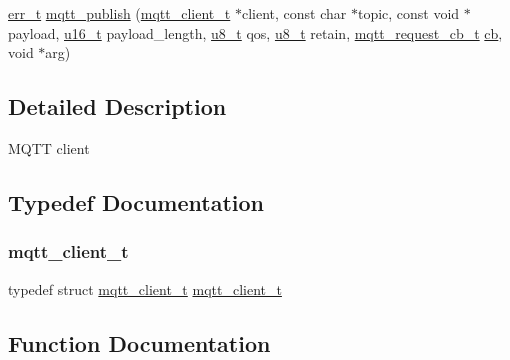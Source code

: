 \begin{DoxyCompactItemize}
\item 
\hyperlink{group__infrastructure__errors_gaf02d9da80fd66b4f986d2c53d7231ddb}{err\+\_\+t} \hyperlink{openmote-cc2538_2lwip_2src_2include_2lwip_2apps_2mqtt_8h_ade9850d716e81fde572cb012be795d2f}{mqtt\+\_\+publish} (\hyperlink{structmqtt__client__t}{mqtt\+\_\+client\+\_\+t} $\ast$client, const char $\ast$topic, const void $\ast$payload, \hyperlink{group__compiler__abstraction_ga77570ac4fcab86864fa1916e55676da2}{u16\+\_\+t} payload\+\_\+length, \hyperlink{group__compiler__abstraction_ga4caecabca98b43919dd11be1c0d4cd8e}{u8\+\_\+t} qos, \hyperlink{group__compiler__abstraction_ga4caecabca98b43919dd11be1c0d4cd8e}{u8\+\_\+t} retain, \hyperlink{group__mqtt_gacad2bbe2cee76eaa120cc63e2f6094fd}{mqtt\+\_\+request\+\_\+cb\+\_\+t} \hyperlink{periph__rtt_2main_8c_afd4145001d494db2ea612e1239724148}{cb}, void $\ast$arg)
\end{DoxyCompactItemize}


\subsection{Detailed Description}
M\+Q\+TT client 

\subsection{Typedef Documentation}
\mbox{\label{openmote-cc2538_2lwip_2src_2include_2lwip_2apps_2mqtt_8h_a3fa4eba06ca6187c7a8a8e7cb22b7e96}} 
\subsubsection{\texorpdfstring{mqtt\+\_\+client\+\_\+t}{mqtt\_client\_t}}
{\footnotesize\ttfamily typedef struct \hyperlink{structmqtt__client__t}{mqtt\+\_\+client\+\_\+t} \hyperlink{structmqtt__client__t}{mqtt\+\_\+client\+\_\+t}}



\subsection{Function Documentation}
\mbox{\label{openmote-cc2538_2lwip_2src_2include_2lwip_2apps_2mqtt_8h_aaa9248041cdc76f3bf528c6434d83967}} 
